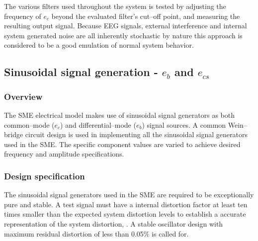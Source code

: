 The various filters used throughout the system is tested by adjusting
the frequency of $e_c$ beyond the evaluated filter's cut--off point,
and measuring the resulting output signal. Because EEG signals,
external interference and internal system generated noise are all
inherently stochastic by nature this approach is considered to be a
good emulation of normal system behavior.

\subsection{Sinusoidal signal generation - $e_b$ and $e_{cs}$} 
\label{section:wein}
\subsubsection{Overview}
The SME electrical model makes use of sinusoidal signal generators as
both common--mode ($e_c$) and differential--mode ($e_b$) signal
sources. A common Wein--bridge circuit design \cite[p30-32]{analog}
\cite[p344-349]{master} \cite[p296-297]{art} 
is used in implementing all the sinusoidal signal generators used in
the SME. The specific component values are varied to achieve desired
frequency and amplitude specifications.

\subsubsection{Design specification}
The sinusoidal signal generators used in the SME are required to be
exceptionally pure and stable. A test signal must have a internal
distortion factor at least ten times smaller than the expected system
distortion levels to establish a accurate representation of the system
distortion, \cite[p296]{art}. A stable oscillator design with maximum
residual distortion of less than 0.05\% is called for.

